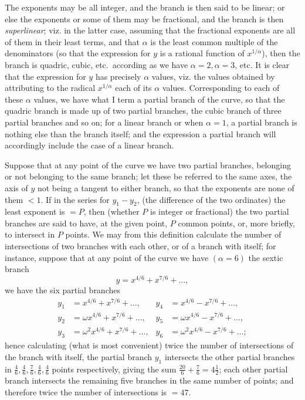 \documentclass[11pt]{article}
\begin{document}
The exponents may be all integer, and the branch is then said to be linear; or else the exponents or some of them may be fractional, and the branch is then \emph{superlinear}; viz. in the latter case, assuming that the fractional exponents are all of them in their least terms, and that $\alpha$ is the least common multiple of the denominators (so that the expression for $y$ is a rational function of $x^{1/\alpha}$), then the branch is quadric, cubic, etc.~according as we have $\alpha = 2, \alpha = 3$, etc. It is clear that the expression for $y$ has precisely $\alpha$ values, viz. the values obtained by attributing to the radical $x^{1/\alpha}$ each of its $\alpha$ values. Corresponding to each of these $\alpha$ values, we have what I term a partial branch of the curve, so that the quadric branch is made up of two partial branches, the cubic branch of three partial branches and so on; for a linear branch or when $\alpha = 1$, a partial branch is nothing else than the branch itself; and the expression a partial branch will accordingly include the case of a linear branch.

Suppose that at any point of the curve we have two partial branches, belonging or not belonging to the same branch; let these be referred to the same axes, the axis of $y$ not being a tangent to either branch, so that the exponents are none of them $< 1$. If in the series for $y_1 - y_2$, (the difference of the two ordinates) the least exponent is $= P$, then (whether $P$ is integer or fractional) the two partial branches are said to have, at the given point, $P$ common points, or, more briefly, to intersect in $P$ points. We may from this definition calculate the number of intersections of two branches with each other, or of a branch with itself; for instance, suppose that at any point of the curve we have $(\alpha = 6)$ the sextic branch
\[ y = x^{4/6} + x^{7/6} + \ldots, \]
we have the six partial branches
\begin{align*}
y_1 &= x^{4/6} + x^{7/6} + \ldots, & y_4 &= x^{4/6} - x^{7/6} + \ldots,\\
y_2 &= \omega x^{4/6} + x^{7/6} + \ldots, & y_5 &= \omega x^{4/6} - x^{7/6} + \ldots,\\
y_3 &= \omega^2 x^{4/6} + x^{7/6} + \ldots, & y_6 &= \omega^2 x^{4/6} - x^{7/6} + \ldots;
\end{align*}
hence calculating (what is most convenient) twice the number of intersections of the branch with itself, the partial branch $y_1$ intersects the other partial branches in $\tfrac{4}{6}, \tfrac{4}{6}, \tfrac{7}{6}, \tfrac{4}{6}, \tfrac{4}{6}$ points respectively, giving the sum $\tfrac{20}{6} + \tfrac{7}{6} = 4\tfrac{1}{2}$; each other partial branch intersects the remaining five branches in the same number of points; and therefore twice the number of intersections is $= 47$.
\end{document}

